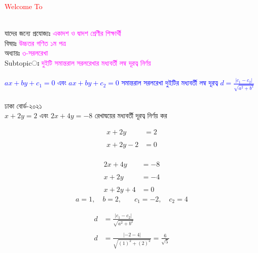 \documentclass{article}
\begin{document}
 
	\Large
	\textcolor{red}{Welcome To} 
	\\
	\\
	যাদের জন্যে প্রযোজ্যঃ  	\textcolor{magenta}{একাদশ ও দ্বাদশ শ্রেণীর শিক্ষার্থী} \\
	বিষয়ঃ \textcolor{magenta}{উচ্চতর গণিত ১ম পত্র} \\
	অধ্যায়ঃ \textcolor{magenta}{৩-সরলরেখা}\\ 
	Subtopicঃ  \textcolor{magenta}{ দুইটি সমান্তরাল সরলরেখার মধ্যবর্তী লম্ব দূরত্ব নির্ণয়  }\\
	\\
	\textcolor{blue}{$ax+by+c_1=0$ এবং $ax+by+c_2=0$ সমান্তরাল সরলরেখা দুইটির মধ্যবর্তী লম্ব দূরত্ব $d=\frac{|c_1-c_2|}{\sqrt{a^2+b^2}}$}\\
	\\
		ঢাকা  বোর্ড-২০২১\\ 
	$x+2y=2$ এবং $2x+4y=-8$ রেখাদ্বয়ের মধ্যবর্তী দূরত্ব নির্ণয় কর \\
	\begin{multicols}{2}
		\begin{align*}
		x+2y&=2\\
		\\
		x+2y-2&=0
	\end{align*}
	\\
	\begin{align*}
		2x+4y&=-8\\
		\\
		x+2y&=-4\\
		\\
		x+2y+4&=0
	\end{align*}
\begin{align*}
	a=1,\quad b=2,&\quad c_1=-2,\quad c_2=4
\end{align*}
	\end{multicols}
\begin{align*}
d&=\frac{|c_1-c_2|}{\sqrt{a^2+b^2}}\\
\\
d&=\frac{|-2-4|}{\sqrt{(1)^2+(2)^2}}=\frac{6}{\sqrt{5}}\\
\end{align*}
\\
	\\
\end{document}
